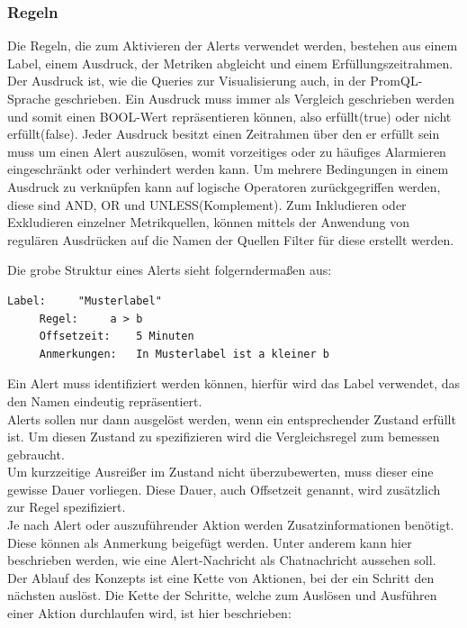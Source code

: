 \documentclass[a4paper,10pt]{scrartcl}
\begin{document}
\subsubsection{Regeln}

Die Regeln, die zum Aktivieren der Alerts verwendet werden, bestehen aus einem Label, einem Ausdruck, der Metriken abgleicht und einem Erfüllungszeitrahmen.
Der Ausdruck ist, wie die Queries zur Visualisierung auch, in der PromQL-Sprache geschrieben. Ein Ausdruck muss immer als Vergleich geschrieben werden und somit einen BOOL-Wert repräsentieren können, also erfüllt(true) oder nicht erfüllt(false).
Jeder Ausdruck besitzt einen Zeitrahmen über den er erfüllt sein muss um einen Alert auszulösen, womit vorzeitiges oder zu häufiges Alarmieren eingeschränkt oder verhindert werden kann.
Um mehrere Bedingungen in einem Ausdruck zu verknüpfen kann auf logische Operatoren zurückgegriffen werden, diese sind AND, OR und UNLESS(Komplement).
Zum Inkludieren oder Exkludieren einzelner Metrikquellen, können mittels der Anwendung von regulären Ausdrücken auf die Namen der Quellen Filter für diese erstellt werden.

Die grobe Struktur eines Alerts sieht folgerndermaßen aus:\\

\begin{lstlisting}[basicstyle=\footnotesize]
     Label:		"Musterlabel"
     Regel:		a > b
     Offsetzeit:	5 Minuten
     Anmerkungen:	In Musterlabel ist a kleiner b
\end{lstlisting}

Ein Alert muss identifiziert werden können, hierfür wird das Label verwendet, das den Namen eindeutig repräsentiert.\\
Alerts sollen nur dann ausgelöst werden, wenn ein entsprechender Zustand erfüllt ist. Um diesen Zustand zu spezifizieren wird die Vergleichsregel zum bemessen gebraucht.\\
Um kurzzeitige Ausreißer im Zustand nicht überzubewerten, muss dieser eine gewisse Dauer vorliegen. Diese Dauer, auch Offsetzeit genannt, wird zusätzlich zur Regel spezifiziert.\\
Je nach Alert oder auszuführender Aktion werden Zusatzinformationen benötigt. Diese können als Anmerkung beigefügt werden. Unter anderem kann hier beschrieben werden, wie eine Alert-Nachricht als Chatnachricht aussehen soll.\\

Der Ablauf des Konzepts ist eine Kette von Aktionen, bei der ein Schritt den nächsten auslöst. Die Kette der Schritte, welche zum Auslösen und Ausführen einer Aktion durchlaufen wird, ist hier beschrieben:\\
\end{document}
